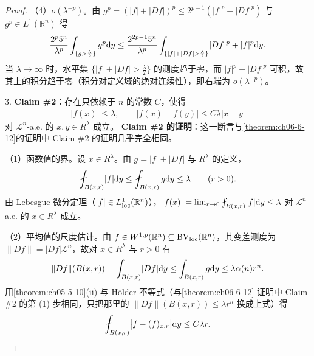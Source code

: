 \documentclass[../../main.tex]{subfiles}%
\begin{document}
\begin{proof}
（4）$o(\lambda^{-p})$。由 $g^p=(|f|+|Df|)^p\le2^{p-1}(|f|^p+|Df|^p)$ 与 $g^p\in L^1(\mathbb{R}^n)$ 得
\begin{align*}
\frac{2^p5^n}{\lambda^p}\int_{\{g>\frac{\lambda}{2}\}}g^p\mathrm{d} y\le\frac{2^{2p-1}5^n}{\lambda^p}\int_{\{\lvert f\rvert+\lvert Df\rvert>\frac{\lambda}{2}\}}\lvert Df\rvert^p+\lvert f\rvert^p\mathrm{d} y .
\end{align*}
当 $\lambda\to\infty$ 时，水平集 $\{\lvert f\rvert+\lvert Df\rvert>\frac{\lambda}{2}\}$ 的测度趋于零，而 $|f|^p+|Df|^p$ 可积，故其上的积分趋于零（积分对定义域的绝对连续性），即右端为 $o(\lambda^{-p})$。

3. \textbf{Claim \#2}：存在只依赖于 $n$ 的常数 $C$，使得
\begin{align*}
\lvert f(x)\rvert\le\lambda,\qquad\lvert f(x)-f(y)\rvert\le C\lambda\lvert x-y\rvert
\end{align*}
对 $\mathcal{L}^n$-a.e. 的 $x,y\in R^\lambda$ 成立。
\textbf{Claim \#2 的证明}：这一断言与\cref{theorem:ch06-6-12}的证明中 Claim \#2 的证明几乎完全相同。%

（1）函数值的界。设 $x\in R^\lambda$。由 $g=\lvert f\rvert+\lvert Df\rvert$ 与 $R^\lambda$ 的定义，
\begin{align*}
\fint_{B(x,r)}\lvert f\rvert\diff y\le\fint_{B(x,r)}g\diff y\le\lambda\qquad(r>0).
\end{align*}
由 Lebesgue 微分定理（$\lvert f\rvert\in L^1_{\mathrm{loc}}(\mathbb{R}^n)$），$\lvert f(x)\rvert=\lim_{r\to0}\fint_{B(x,r)}\lvert f\rvert\diff y\le\lambda$ 对 $\mathcal{L}^n$-a.e. 的 $x\in R^\lambda$ 成立。

（2）平均值的尺度估计。由 $f\in W^{1,p}(\mathbb{R}^n)\subseteq\mathrm{BV}_{\mathrm{loc}}(\mathbb{R}^n)$，其变差测度为 $\lVert Df\rVert=\lvert Df\rvert\mathcal{L}^n$，故对 $x\in R^\lambda$ 与 $r>0$ 有
\begin{align*}
\lVert Df\rVert(B(x,r))=\int_{B(x,r)}\lvert Df\rvert\mathrm{d} y\le\int_{B(x,r)}g\mathrm{d} y\le\lambda\alpha(n)r^n .
\end{align*}
用\cref{theorem:ch05-5-10}(ii) 与 Hölder 不等式（与\cref{theorem:ch06-6-12} 证明中 Claim \#2 的第 (1) 步相同，只把那里的 $\lVert Df\rVert(B(x,r))\le\lambda r^n$ 换成上式）得%
\begin{align*}
\fint_{B(x,r)}\bigl\lvert f-(f)_{x,r}\bigr\rvert\diff y\le C\lambda r .
\end{align*}


\end{proof}
\end{document}
